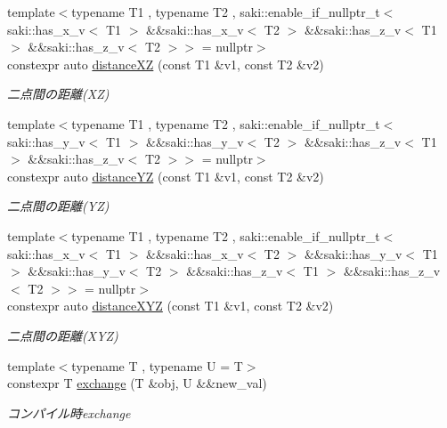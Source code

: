\begin{DoxyCompactItemize}
{\footnotesize template$<$typename T1 , typename T2 , saki\+::enable\+\_\+if\+\_\+nullptr\+\_\+t$<$ saki\+::has\+\_\+x\+\_\+v$<$ T1 $>$ \&\&saki\+::has\+\_\+x\+\_\+v$<$ T2 $>$ \&\&saki\+::has\+\_\+z\+\_\+v$<$ T1 $>$ \&\&saki\+::has\+\_\+z\+\_\+v$<$ T2 $>$$>$  = nullptr$>$ }\\constexpr auto \mbox{\hyperlink{namespacesaki_a6bd1999d77d0ba6f6101747d82593c66}{distance\+XZ}} (const T1 \&v1, const T2 \&v2)
\begin{DoxyCompactList}\small\item\em 二点間の距離(\+X\+Z) \end{DoxyCompactList}\item 
{\footnotesize template$<$typename T1 , typename T2 , saki\+::enable\+\_\+if\+\_\+nullptr\+\_\+t$<$ saki\+::has\+\_\+y\+\_\+v$<$ T1 $>$ \&\&saki\+::has\+\_\+y\+\_\+v$<$ T2 $>$ \&\&saki\+::has\+\_\+z\+\_\+v$<$ T1 $>$ \&\&saki\+::has\+\_\+z\+\_\+v$<$ T2 $>$$>$  = nullptr$>$ }\\constexpr auto \mbox{\hyperlink{namespacesaki_a708a45bd2134a3a276e7acb2566eb8c1}{distance\+YZ}} (const T1 \&v1, const T2 \&v2)
\begin{DoxyCompactList}\small\item\em 二点間の距離(\+Y\+Z) \end{DoxyCompactList}\item 
{\footnotesize template$<$typename T1 , typename T2 , saki\+::enable\+\_\+if\+\_\+nullptr\+\_\+t$<$ saki\+::has\+\_\+x\+\_\+v$<$ T1 $>$ \&\&saki\+::has\+\_\+x\+\_\+v$<$ T2 $>$ \&\&saki\+::has\+\_\+y\+\_\+v$<$ T1 $>$ \&\&saki\+::has\+\_\+y\+\_\+v$<$ T2 $>$ \&\&saki\+::has\+\_\+z\+\_\+v$<$ T1 $>$ \&\&saki\+::has\+\_\+z\+\_\+v$<$ T2 $>$$>$  = nullptr$>$ }\\constexpr auto \mbox{\hyperlink{namespacesaki_af202425b916b22c2b3a26731689d5c21}{distance\+X\+YZ}} (const T1 \&v1, const T2 \&v2)
\begin{DoxyCompactList}\small\item\em 二点間の距離(\+X\+Y\+Z) \end{DoxyCompactList}\item 
{\footnotesize template$<$typename T , typename U  = T$>$ }\\constexpr T \mbox{\hyperlink{namespacesaki_ace0188c33098d6ac615fc71e64ab6dda}{exchange}} (T \&obj, U \&\&new\+\_\+val)
\begin{DoxyCompactList}\small\item\em コンパイル時exchange \end{DoxyCompactList}\item 

\end{DoxyCompactItemize}
